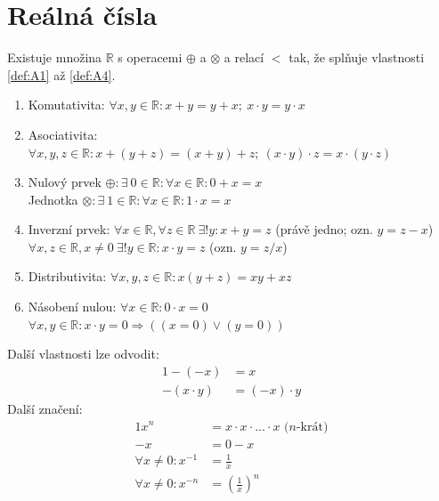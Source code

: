 \section{Reálná čísla}

\begin{theoremAlph}
	Existuje množina $\mathbb{R}$ s operacemi $\oplus$ a $\otimes$ a relací $<$ tak,
	že splňuje vlastnosti \autoref{def:A1} až \autoref{def:A4}.
\end{theoremAlph}

\begin{definitionAi}[name=Algebraická struktura, label=def:A1]\noindent
	\begin{enumerate}[I]
		\item Komutativita: $\forall x, y \in \mathbb{R}: x + y = y + x;~x\cdot y = y\cdot x$
		\item Asociativita: $\forall x, y, z \in \mathbb{R}: x + (y + z) = (x + y) + z;
			~(x\cdot y)\cdot z = x\cdot (y\cdot z)$
		\item Nulový prvek $\oplus: \exists~0 \in \mathbb{R}: \forall x \in \mathbb{R}: 0 + x = x$ \\
		Jednotka $\otimes: \exists~1 \in \mathbb{R}: \forall x \in \mathbb{R}: 1 \cdot x = x$
		\item Inverzní prvek: $\forall x \in \mathbb{R}, \forall z \in \mathbb{R}~\exists ! y:
			x + y = z$ (právě jedno; ozn. $y = z - x$) \\
		$\forall x, z \in \mathbb{R}, x\neq0 ~\exists ! y \in \mathbb{R}:
			x \cdot y = z$ (ozn. $y = z / x$)
		\item Distributivita: $\forall x, y, z \in \mathbb{R}: x (y + z) = xy + xz$
		\item Násobení nulou: $\forall x \in \mathbb{R}: 0\cdot x = 0$ \\
		$\forall x, y \in \mathbb{R}: x\cdot y = 0 \Rightarrow ((x = 0) \lor (y = 0))$
	\end{enumerate}
\end{definitionAi}
Další vlastnosti lze odvodit:
\begin{alignat}{1}
	-(-x) &= x \\
	-(x\cdot y) &= (-x)\cdot y
\end{alignat}
Další značení:
\begin{alignat}{1}
	x^n &= x\cdot x\cdot \text{...} \cdot x \text{~($n$-krát)} \\
	-x &= 0 - x \\
	\forall x \neq 0: x^{-1} &= \frac{1}{x} \\
	\forall x \neq 0: x^{-n} &= \left( \frac{1}{x} \right)^n
\end{alignat}

